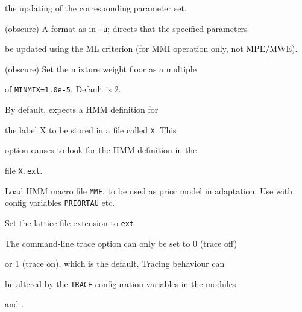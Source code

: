 \begin{optlist}
      the updating of the corresponding parameter set.





   (obscure) A format as in \texttt{-u}; directs that the specified parameters


     be updated using the ML criterion (for MMI operation only, not MPE/MWE).





   (obscure) Set the mixture weight floor as a multiple


    of \texttt{MINMIX=1.0e-5}.  Default is 2.





    By default,  expects a HMM definition for 


      the label X to be stored in a file called {\tt X}.  This


      option causes  to look for the HMM definition in the


      file {\tt X.ext}.


\stdoptB


\stdoptF


\stdoptH


  Load HMM macro file {\tt MMF}, to be used as prior model in adaptation.  Use with config variables {\tt PRIORTAU} etc.  


\stdoptI


\stdoptM





  Set the lattice file extension to {\tt ext}


\end{optlist}


















The command-line trace option can only be set to 0 (trace off)


or 1 (trace on), which is the default.  Tracing behaviour can


be altered by the {\tt TRACE} configuration variables in the modules 


and .





















